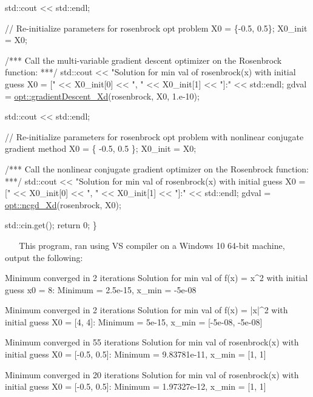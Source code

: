 \begin{DoxyCodeInclude}
    std::cout << std::endl;

    \textcolor{comment}{// Re-initialize parameters for rosenbrock opt problem}
    X0 = \{-0.5, 0.5\};
    X0\_init = X0;

    \textcolor{comment}{/*** Call the multi-variable gradient descent optimizer on the Rosenbrock function: ***/}
    std::cout << \textcolor{stringliteral}{"Solution for min val of rosenbrock(x) with initial guess X0 = ["} << X0\_init[0] << \textcolor{stringliteral}{", "} <<
       X0\_init[1] << \textcolor{stringliteral}{"]:"} << std::endl;
    gdval = \mbox{\hyperlink{namespaceopt_a7db27c86e1c5a503b7f8373ba067d97b}{opt::gradientDescent\_Xd}}(rosenbrock, X0, 1.e-10);

    std::cout << std::endl;

    \textcolor{comment}{// Re-initialize parameters for rosenbrock opt problem with nonlinear conjugate gradient method}
    X0 = \{ -0.5, 0.5 \};
    X0\_init = X0;

    \textcolor{comment}{/*** Call the nonlinear conjugate gradient optimizer on the Rosenbrock function: ***/}
    std::cout << \textcolor{stringliteral}{"Solution for min val of rosenbrock(x) with initial guess X0 = ["} << X0\_init[0] << \textcolor{stringliteral}{", "} <<
       X0\_init[1] << \textcolor{stringliteral}{"]:"} << std::endl;
    gdval = \mbox{\hyperlink{namespaceopt_a8f434753958049daab7129ea247a97ff}{opt::ncgd\_Xd}}(rosenbrock, X0);

    std::cin.get();
    \textcolor{keywordflow}{return} 0;
\}
\end{DoxyCodeInclude}
 ~\newline
~\newline
 This program, ran using VS compiler on a Windows 10 64-\/bit machine, output the following\+: ~\newline
 
\begin{DoxyCode}
Minimum converged in 2 iterations
Solution for min val of f(x) = x^2 with initial guess x0 = 8:
        Minimum = 2.5e-15, x\_min = -5e-08

Minimum converged in 2 iterations
Solution for min val of f(x) = |x|^2 with initial guess X0 = [4, 4]:
        Minimum = 5e-15, x\_min = [-5e-08, -5e-08]

Minimum converged in 55 iterations
Solution for min val of rosenbrock(x) with initial guess X0 = [-0.5, 0.5]:
    Minimum = 9.83781e-11, x\_min = [1, 1]

Minimum converged in 20 iterations
Solution for min val of rosenbrock(x) with initial guess X0 = [-0.5, 0.5]:
    Minimum = 1.97327e-12, x\_min = [1, 1]
\end{DoxyCode}
 

